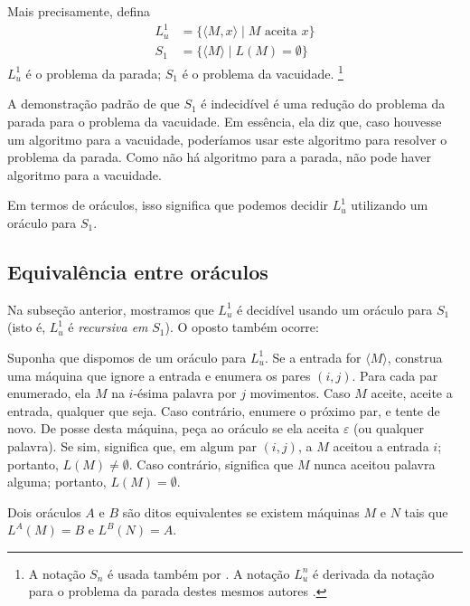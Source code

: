 Mais precisamente, defina
\begin{align*}
    L_u^1 &= \{ \langle M, x \rangle \mid M \text{ aceita } x \} \\
    S_1 &= \{ \langle M \rangle \mid L(M) = \emptyset \}
\end{align*}
$L_u^1$ é o problema da parada; $S_1$ é o problema da vacuidade.%
\footnote{
    A notação $S_n$ é usada também por .
    A notação $L_u^n$ é derivada da notação para o problema da parada
    destes mesmos autores \cite[p.~183]{HopcroftUllman1979}.
}

A demonstração padrão de que $S_1$ é indecidível
é uma redução do problema da parada para o problema da vacuidade.
Em essência, ela diz que,
caso houvesse um algoritmo para a vacuidade,
poderíamos usar este algoritmo para resolver o problema da parada.
Como não há algoritmo para a parada,
não pode haver algoritmo para a vacuidade.

Em termos de oráculos,
isso significa que podemos decidir $L_u^1$
utilizando um oráculo para $S_1$.

\subsection{Equivalência entre oráculos}

Na subseção anterior,
mostramos que $L_u^1$ é decidível usando um oráculo para $S_1$
(isto é, $L_u^1$ é \emph{recursiva em} $S_1$).
O oposto também ocorre:

Suponha que dispomos de um oráculo para $L_u^1$.
Se a entrada for $\langle M \rangle$,
construa uma máquina que ignore a entrada
e enumera os pares $(i, j)$.
Para cada par enumerado,
ela $M$ na $i$-ésima palavra por $j$ movimentos.
Caso $M$ aceite, aceite a entrada, qualquer que seja.
Caso contrário, enumere o próximo par, e tente de novo.
De posse desta máquina, peça ao oráculo se ela aceita $\varepsilon$
(ou qualquer palavra).
Se sim, significa que, em algum par $(i, j)$,
a $M$ aceitou a entrada $i$; portanto, $L(M) \neq \emptyset$.
Caso contrário, significa que $M$ nunca aceitou palavra alguma;
portanto, $L(M) = \emptyset$.

\begin{definition}
    Dois oráculos $A$ e $B$ são ditos equivalentes
    se existem máquinas $M$ e $N$ tais que
    $L^A(M) = B$ e $L^B(N) = A$.
\end{definition}

